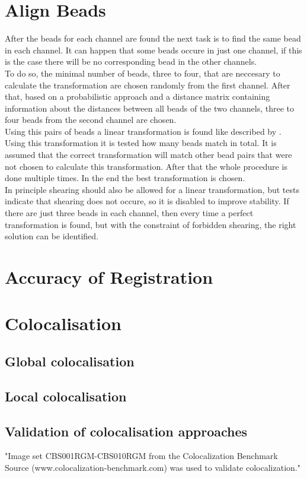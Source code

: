\section{Align Beads}
After the beads for each channel are found the next task is to find the same
bead in each channel. It can happen that some beads occure in just one channel,
if this is the case there will be no corresponding bead in the other
channels.\\
To do so, the minimal number of beads, three to four, that are neccesary to
calculate the transformation are chosen randomly from the first channel. After that, based on
a probabilistic approach and a distance matrix containing information about the
distances between all beads of the two channels, three to four beads from the
second channel are chosen.\\
Using this pairs of beads a linear transformation is found like described by
\cite{MAJoachim}. Using this transformation it is tested how many beads match in
total. It is assumed that the correct transformation will match other bead pairs
that were not chosen to calculate this transformation. After that the whole
procedure is done multiple times. In the end the best transformation is
chosen.\\
In principle shearing should also be allowed for a linear transformation, but tests
indicate that shearing does not occure, so it is disabled to improve stability. If there are just
three beads in each channel, then every time a perfect transformation is found,
but with the constraint of forbidden shearing, the right solution can be
identified.

\section{Accuracy of Registration}

\section{Colocalisation}
\subsection{Global colocalisation}
\subsection{Local colocalisation}
\subsection{Validation of colocalisation approaches}
"Image set CBS001RGM-CBS010RGM from the Colocalization Benchmark Source
(www.colocalization-benchmark.com) was used to validate colocalization."
